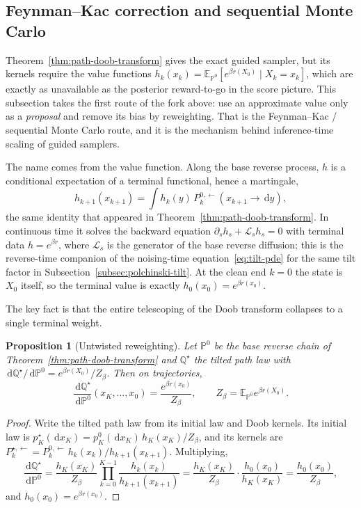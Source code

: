 \documentclass{amsart}
\numberwithin{equation}{section}
\theoremstyle{plain}
\newtheorem{prop}[theorem]{Proposition}
\theoremstyle{definition}
\theoremstyle{remark}
\newcommand{\E}{\mathbb{E}}
\newcommand{\Pp}{\mathbb{P}}
\newcommand{\dd}{\,\mathrm{d}}
\begin{document}
\subsection{Feynman--Kac correction and sequential Monte Carlo}
\label{subsec:feynman-kac}

Theorem~\ref{thm:path-doob-transform} gives the exact guided sampler, but its
kernels require the value functions
$h_k(x_k)=\E_{\Pp^0}[e^{\beta r(X_0)}\mid X_k=x_k]$, which are exactly as
unavailable as the posterior reward-to-go in the score picture.  This subsection
takes the first route of the fork above: use an approximate value only as a
\emph{proposal} and remove its bias by reweighting.  That is the
Feynman--Kac / sequential Monte Carlo route, and it is the mechanism behind
inference-time scaling of guided samplers.

The name comes from the value function.  Along the base reverse process, $h$ is
a conditional expectation of a terminal functional, hence a martingale,
\[
    h_{k+1}(x_{k+1})=\int h_k(y)\,
    P_k^{0,\leftarrow}(x_{k+1}\to \dd y),
\]
the same identity that appeared in Theorem~\ref{thm:path-doob-transform}.  In
continuous time it solves the backward equation
$\partial_s h_s+\mathcal L_s h_s=0$ with terminal data $h=e^{\beta r}$, where
$\mathcal L_s$ is the generator of the base reverse diffusion; this is the
reverse-time companion of the noising-time equation~\eqref{eq:tilt-pde} for the
same tilt factor in Subsection~\ref{subsec:polchinski-tilt}.  At the clean end
$k=0$ the state is $X_0$ itself, so the terminal value is exactly
$h_0(x_0)=e^{\beta r(x_0)}$.

The key fact is that the entire telescoping of the Doob transform collapses to a
single terminal weight.

\begin{prop}[Untwisted reweighting]
\label{prop:untwisted-weight}
Let $\Pp^0$ be the base reverse chain of
Theorem~\ref{thm:path-doob-transform} and $\mathbb Q^\star$ the tilted path law
with $\dd\mathbb Q^\star/\dd\Pp^0=e^{\beta r(X_0)}/Z_\beta$.  Then on
trajectories,
\[
    \frac{\dd\mathbb Q^\star}{\dd\Pp^0}(x_K,\ldots,x_0)
    =
    \frac{e^{\beta r(x_0)}}{Z_\beta},
    \qquad
    Z_\beta=\E_{\Pp^0}e^{\beta r(X_0)}.
\]
\end{prop}

\begin{proof}
Write the tilted path law from its initial law and Doob kernels.  Its initial
law is $p_K^\star(\dd x_K)=p_K^0(\dd x_K)\,h_K(x_K)/Z_\beta$, and its kernels
are
$P_k^{\star,\leftarrow}
=P_k^{0,\leftarrow}\,h_k(x_k)/h_{k+1}(x_{k+1})$.  Multiplying,
\[
    \frac{\dd\mathbb Q^\star}{\dd\Pp^0}
    =
    \frac{h_K(x_K)}{Z_\beta}
    \prod_{k=0}^{K-1}\frac{h_k(x_k)}{h_{k+1}(x_{k+1})}
    =
    \frac{h_K(x_K)}{Z_\beta}\cdot\frac{h_0(x_0)}{h_K(x_K)}
    =
    \frac{h_0(x_0)}{Z_\beta},
\]
and $h_0(x_0)=e^{\beta r(x_0)}$.
\end{proof}
\end{document}
